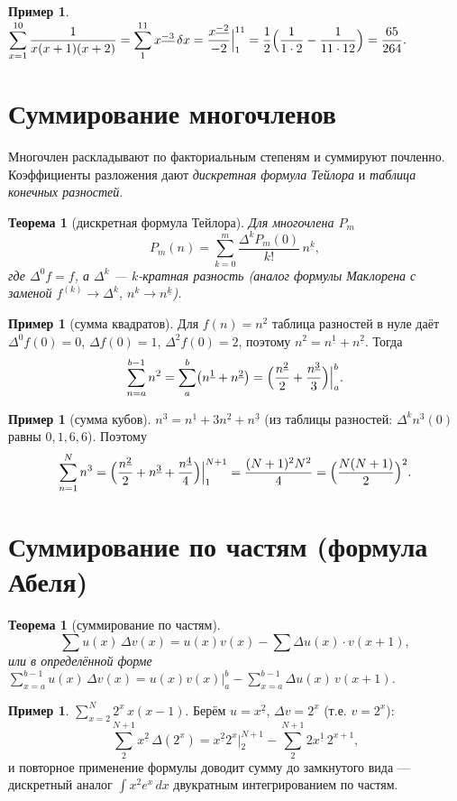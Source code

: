 \documentclass[11pt,a4paper]{article}
\theoremstyle{definition}
\newtheorem{example}[definition]{Пример}
\theoremstyle{plain}
\newtheorem{theorem}[definition]{Теорема}
\begin{document}
\begin{example}
$\displaystyle\sum_{x=1}^{10}\frac{1}{x(x+1)(x+2)}=\sum_{1}^{11}x^{\underline{-3}}\,\delta x
=\frac{x^{\underline{-2}}}{-2}\Big|_1^{11}
=\frac12\Bigl(\frac{1}{1\cdot2}-\frac{1}{11\cdot12}\Bigr)=\frac{65}{264}.$
\end{example}

\section{Суммирование многочленов}

Многочлен раскладывают по факториальным степеням и суммируют почленно. Коэффициенты разложения
дают \emph{дискретная формула Тейлора} и \emph{таблица конечных разностей}.

\begin{theorem}[дискретная формула Тейлора]
Для многочлена $P_m$
\[
  P_m(n)=\sum_{k=0}^{m}\frac{\Delta^k P_m(0)}{k!}\,n^{\underline k},
\]
где $\Delta^0 f=f$, а $\Delta^k$ — $k$-кратная разность (аналог формулы Маклорена с заменой
$f^{(k)}\to\Delta^k$, $n^k\to n^{\underline k}$).
\end{theorem}

\begin{example}[сумма квадратов]
Для $f(n)=n^2$ таблица разностей в нуле даёт $\Delta^0 f(0)=0$, $\Delta f(0)=1$,
$\Delta^2 f(0)=2$, поэтому $n^2=n^{\underline1}+n^{\underline2}$. Тогда
\[
  \sum_{n=a}^{b-1}n^2=\sum_a^b\bigl(n^{\underline1}+n^{\underline2}\bigr)
   =\Bigl(\frac{n^{\underline2}}{2}+\frac{n^{\underline3}}{3}\Bigr)\Big|_a^b .
\]
\end{example}

\begin{example}[сумма кубов]
$n^3=n^{\underline1}+3n^{\underline2}+n^{\underline3}$ (из таблицы разностей: $\Delta^k n^3(0)$
равны $0,1,6,6$). Поэтому
\[
  \sum_{n=1}^{N}n^3=\Bigl(\frac{n^{\underline2}}{2}+n^{\underline3}+\frac{n^{\underline4}}{4}\Bigr)
   \Big|_1^{N+1}=\frac{(N+1)^2 N^2}{4}=\Bigl(\frac{N(N+1)}{2}\Bigr)^2 .
\]
\end{example}

\section{Суммирование по частям (формула Абеля)}

\begin{theorem}[суммирование по частям]
\[
  \sum u(x)\,\Delta v(x)=u(x)v(x)-\sum \Delta u(x)\cdot v(x+1),
\]
или в определённой форме
$\displaystyle\sum_{x=a}^{b-1}u(x)\,\Delta v(x)=u(x)v(x)\Big|_a^b-\sum_{x=a}^{b-1}\Delta u(x)\,
v(x+1)$.
\end{theorem}

\begin{example}
$\displaystyle\sum_{x=2}^{N}2^{x}\,x(x-1)$. Берём $u=x^{\underline2}$, $\Delta v=2^x$ (т.е.
$v=2^x$):
\[
  \sum_{2}^{N+1}x^{\underline2}\,\Delta(2^x)=x^{\underline2}2^{x}\Big|_2^{N+1}
   -\sum_{2}^{N+1}2x^{\underline1}\,2^{x+1},
\]
и повторное применение формулы доводит сумму до замкнутого вида — дискретный аналог
$\int x^2 e^x\,dx$ двукратным интегрированием по частям.
\end{example}
\end{document}
